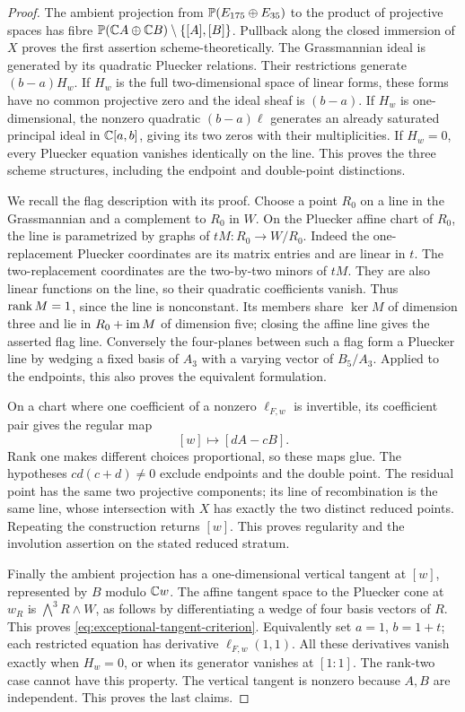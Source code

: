 \begin{proof}
The ambient projection from \(\mathbb P(E_{175}\oplus E_{35})\) to the
product of projective spaces has fibre
\(\mathbb P(\mathbb C A\oplus\mathbb C B)\setminus\{[A],[B]\}\).
Pullback along the closed immersion of \(X\) proves the first
assertion scheme-theoretically.  The Grassmannian ideal is generated
by its quadratic Pluecker relations.  Their restrictions generate
\((b-a)H_w\).  If \(H_w\) is the full two-dimensional space of
linear forms, these forms have no common projective zero and the
ideal sheaf is \((b-a)\).  If \(H_w\) is one-dimensional, the
nonzero quadratic \((b-a)\ell\) generates an already saturated
principal ideal in \(\mathbb C[a,b]\), giving its two zeros with their
multiplicities.  If \(H_w=0\), every Pluecker equation vanishes
identically on the line.  This proves the three scheme structures,
including the endpoint and double-point distinctions.

We recall the flag description with its proof.  Choose a point
\(R_0\) on a line in the Grassmannian and a complement to \(R_0\)
in \(W\).  On the Pluecker affine chart of \(R_0\), the line is
parametrized by graphs of \(tM:R_0\to W/R_0\).  Indeed the
one-replacement Pluecker coordinates are its matrix entries and are
linear in \(t\).  The two-replacement coordinates are the two-by-two
minors of \(tM\).  They are also linear functions on the line, so
their quadratic coefficients vanish.  Thus \(\operatorname{rank} M=1\), since
the line is nonconstant.  Its members share \(\ker M\) of dimension
three and lie in \(R_0+\operatorname{im} M\) of dimension five; closing the affine
line gives the asserted flag line.  Conversely the four-planes
between such a flag form a Pluecker line by wedging a fixed basis of
\(A_3\) with a varying vector of \(B_5/A_3\).  Applied to the
endpoints, this also proves the equivalent formulation.

On a chart where one coefficient of a nonzero \(\ell_{F,w}\) is
invertible, its coefficient pair gives the regular map
\[
 [w]\longmapsto[dA-cB].
\]
Rank one makes different choices proportional, so these maps glue.
The hypotheses \(cd(c+d)\ne0\) exclude endpoints and the double
point.  The residual point has the same two projective components;
its line of recombination is the same line, whose intersection with
\(X\) has exactly the two distinct reduced points.  Repeating the
construction returns \([w]\).  This proves regularity and the
involution assertion on the stated reduced stratum.

Finally the ambient projection has a one-dimensional vertical tangent
at \([w]\), represented by \(B\) modulo \(\mathbb C w\).  The affine
tangent space to the Pluecker cone at \(w_R\) is
\(\bigwedge^3R\wedge W\), as follows by differentiating a wedge
of four basis vectors of \(R\).  This proves
\eqref{eq:exceptional-tangent-criterion}.  Equivalently set \(a=1\),
\(b=1+t\); each restricted equation has derivative
\(\ell_{F,w}(1,1)\).  All these derivatives vanish exactly when
\(H_w=0\), or when its generator vanishes at \([1:1]\).
The rank-two case cannot have this property.  The vertical tangent
is nonzero because \(A,B\) are independent.  This proves the last
claims.
\end{proof}

